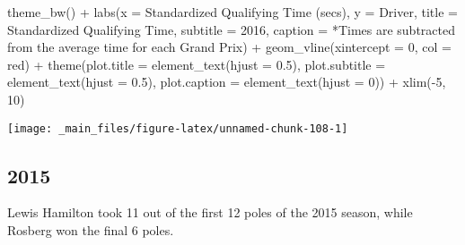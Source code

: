 \documentclass[
]{book}
\newenvironment{Shaded}{\begin{snugshade}}{\end{snugshade}}
\newcommand{\AttributeTok}[1]{\textcolor[rgb]{0.77,0.63,0.00}{#1}}
\newcommand{\DecValTok}[1]{\textcolor[rgb]{0.00,0.00,0.81}{#1}}
\newcommand{\FloatTok}[1]{\textcolor[rgb]{0.00,0.00,0.81}{#1}}
\newcommand{\FunctionTok}[1]{\textcolor[rgb]{0.00,0.00,0.00}{#1}}
\newcommand{\NormalTok}[1]{#1}
\newcommand{\SpecialCharTok}[1]{\textcolor[rgb]{0.00,0.00,0.00}{#1}}
\newcommand{\StringTok}[1]{\textcolor[rgb]{0.31,0.60,0.02}{#1}}
\begin{document}
\begin{Shaded}
\begin{Highlighting}[]
  \FunctionTok{theme\_bw}\NormalTok{() }\SpecialCharTok{+}
  \FunctionTok{labs}\NormalTok{(}\AttributeTok{x =} \StringTok{\textquotesingle{}Standardized Qualifying Time (secs)\textquotesingle{}}\NormalTok{,}
       \AttributeTok{y =} \StringTok{\textquotesingle{}Driver\textquotesingle{}}\NormalTok{,}
       \AttributeTok{title =} \StringTok{\textquotesingle{}Standardized Qualifying Time\textquotesingle{}}\NormalTok{,}
       \AttributeTok{subtitle =} \StringTok{\textquotesingle{}2016\textquotesingle{}}\NormalTok{,}
       \AttributeTok{caption =} \StringTok{\textquotesingle{}*Times are subtracted from the average time for each Grand Prix\textquotesingle{}}\NormalTok{) }\SpecialCharTok{+}
  \FunctionTok{geom\_vline}\NormalTok{(}\AttributeTok{xintercept =} \DecValTok{0}\NormalTok{, }\AttributeTok{col =} \StringTok{\textquotesingle{}red\textquotesingle{}}\NormalTok{) }\SpecialCharTok{+}
  \FunctionTok{theme}\NormalTok{(}\AttributeTok{plot.title =} \FunctionTok{element\_text}\NormalTok{(}\AttributeTok{hjust =} \FloatTok{0.5}\NormalTok{),}
        \AttributeTok{plot.subtitle =} \FunctionTok{element\_text}\NormalTok{(}\AttributeTok{hjust =} \FloatTok{0.5}\NormalTok{),}
        \AttributeTok{plot.caption =} \FunctionTok{element\_text}\NormalTok{(}\AttributeTok{hjust =} \DecValTok{0}\NormalTok{)) }\SpecialCharTok{+}
  \FunctionTok{xlim}\NormalTok{(}\SpecialCharTok{{-}}\DecValTok{5}\NormalTok{, }\DecValTok{10}\NormalTok{)}
\end{Highlighting}
\end{Shaded}

\begin{center}\texttt{[image: \_main\_files/figure-latex/unnamed-chunk-108-1]} \end{center}

\hypertarget{section-8}{%
\subsection{2015}\label{section-8}}

Lewis Hamilton took 11 out of the first 12 poles of the 2015 season, while Rosberg won the final 6 poles.
\end{document}
